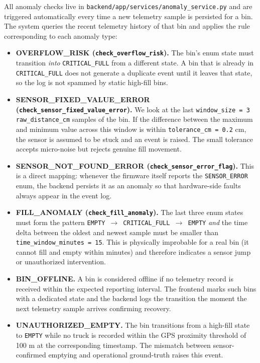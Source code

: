 \documentclass[12pt,a4paper]{report}
\begin{document}
\indent All anomaly checks live in \texttt{backend/app/services/anomaly\_service.py} and are triggered automatically every time a new telemetry sample is persisted for a bin. The system queries the recent telemetry history of that bin and applies the rule corresponding to each anomaly type:

\begin{itemize}[leftmargin=*]
  \item \textbf{OVERFLOW\_RISK (\texttt{check\_overflow\_risk}).} The bin's enum state must transition \textit{into} \texttt{CRITICAL\_FULL} from a different state. A bin that is already in \texttt{CRITICAL\_FULL} does not generate a duplicate event until it leaves that state, so the log is not spammed by static high-fill bins.
  \item \textbf{SENSOR\_FIXED\_VALUE\_ERROR (\texttt{check\_sensor\_fixed\_value\_error}).} We look at the last \texttt{window\_size = 3} \texttt{raw\_distance\_cm} samples of the bin. If the difference between the maximum and minimum value across this window is within \texttt{tolerance\_cm = 0.2} cm, the sensor is assumed to be stuck and an event is raised. The small tolerance accepts micro-noise but rejects genuine fill movement.
  \item \textbf{SENSOR\_NOT\_FOUND\_ERROR (\texttt{check\_sensor\_error\_flag}).} This is a direct mapping: whenever the firmware itself reports the \texttt{SENSOR\_ERROR} enum, the backend persists it as an anomaly so that hardware-side faults always appear in the event log.
  \clearpage
  \item \textbf{FILL\_ANOMALY (\texttt{check\_fill\_anomaly}).} The last three enum states must form the pattern \texttt{EMPTY $\rightarrow$ CRITICAL\_FULL $\rightarrow$ EMPTY} \textit{and} the time delta between the oldest and newest sample must be smaller than \texttt{time\_window\_minutes = 15}. This is physically improbable for a real bin (it cannot fill and empty within minutes) and therefore indicates a sensor jump or unauthorized intervention.
  \item \textbf{BIN\_OFFLINE.} A bin is considered offline if no telemetry record is received within the expected reporting interval. The frontend marks such bins with a dedicated state and the backend logs the transition the moment the next telemetry sample arrives confirming recovery.
  \item \textbf{UNAUTHORIZED\_EMPTY.} The bin transitions from a high-fill state to \texttt{EMPTY} while no truck is recorded within the GPS proximity threshold of 100 m at the corresponding timestamp. The mismatch between sensor-confirmed emptying and operational ground-truth raises this event.
\end{itemize}
\end{document}
